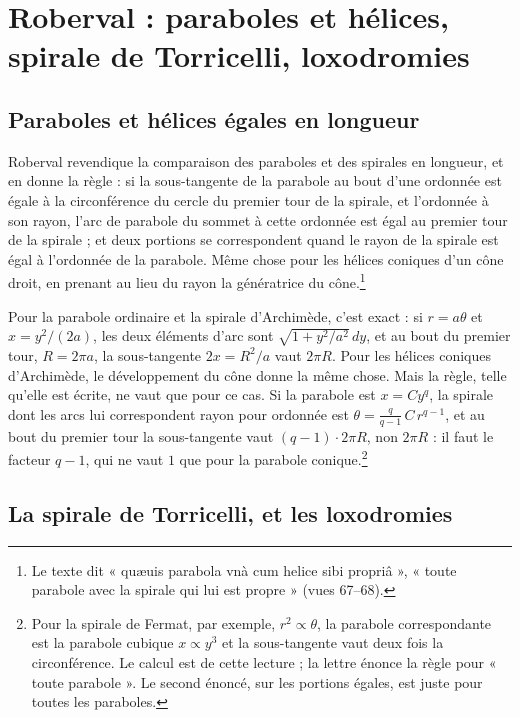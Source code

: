 \documentclass[11pt,a4paper]{article}
\begin{document}
\section*{Roberval : paraboles et hélices, spirale de Torricelli, loxodromies}

\subsection*{Paraboles et hélices égales en longueur}

Roberval revendique la comparaison des paraboles et des spirales en longueur, et
en donne la règle : si la sous-tangente de la parabole au bout d'une ordonnée
est égale à la circonférence du cercle du premier tour de la spirale, et
l'ordonnée à son rayon, l'arc de parabole du sommet à cette ordonnée est égal au
premier tour de la spirale ; et deux portions se correspondent quand le rayon de
la spirale est égal à l'ordonnée de la parabole. Même chose pour les hélices
coniques d'un cône droit, en prenant au lieu du rayon la génératrice du
cône.\footnote{Le texte dit « quæuis parabola vnà cum helice sibi propriâ », « toute
parabole avec la spirale qui lui est propre » (vues 67--68).}

Pour la parabole ordinaire et la spirale d'Archimède, c'est exact : si
$r=a\theta$ et $x = y^2/(2a)$, les deux éléments d'arc sont
$\sqrt{1+y^2/a^2}\,dy$, et au bout du premier tour, $R=2\pi a$, la
sous-tangente $2x = R^2/a$ vaut $2\pi R$. Pour les hélices coniques
d'Archimède, le développement du cône donne la même chose. Mais la règle, telle
qu'elle est écrite, ne vaut que pour ce cas. Si la parabole est $x = Cy^q$, la
spirale dont les arcs lui correspondent rayon pour ordonnée est $\theta =
\frac{q}{q-1}\,C\,r^{q-1}$, et au bout du premier tour la sous-tangente vaut
$(q-1)\cdot 2\pi R$, non $2\pi R$ : il faut le facteur $q-1$, qui ne vaut $1$ que
pour la parabole conique.\footnote{Pour la spirale de Fermat, par exemple,
$r^2\propto\theta$, la parabole correspondante est la parabole cubique $x\propto
y^3$ et la sous-tangente vaut deux fois la circonférence. Le calcul est de cette
lecture ; la lettre énonce la règle pour « toute parabole ». Le second énoncé,
sur les portions égales, est juste pour toutes les paraboles.}

\subsection*{La spirale de Torricelli, et les loxodromies}
\end{document}
